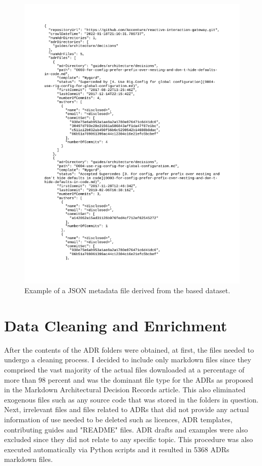         \begin{figure}[]
            \centering
            \includegraphics[scale=0.4]{figures/JSON_data_example.png}
            \caption{Example of a JSON metadata file derived from the based dataset.}
            \label{fig:JSON_data}
        \end{figure}
        
    \section{Data Cleaning and Enrichment}
        After the contents of the ADR folders were obtained, at first, the files needed to undergo a cleaning process. I decided to include only markdown files since they comprised the vast majority of the actual files downloaded at a percentage of more than 98 percent and was the dominant file type for the ADRs as proposed in the Markdown Architectural Decision Records \cite{MarkdownADRs} article. This also eliminated exogenous files such as any source code that was stored in the folders in question. Next, irrelevant files and files related to ADRs that did not provide any actual information of use needed to be deleted such as licences, ADR templates, contributing guides and "README" files. ADR drafts and examples were also excluded since they did not relate to any specific topic. This procedure was also executed automatically via Python scripts and it resulted in 5368 ADRs markdown files.

